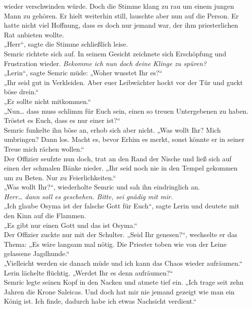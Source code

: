 wieder verschwinden würde. Doch die Stimme klang zu rau um einem jungen Mann zu gehören. Er hielt 
weiterhin still, lauschte aber nun auf die Person. Er hatte nicht viel Hoffnung, dass es doch nur 
jemand war, der ihm priesterlichen Rat anbieten wollte.\\
„Herr“, sagte die Stimme schließlich leise.\\
Semric richtete sich auf. In seinem Gesicht zeichnete sich Erschöpfung und Frustration wieder. 
\textit{Bekomme ich nun doch deine Klinge zu spüren?}\\
„Lerin“, sagte Semric müde: „Woher wusstet Ihr es?“\\
„Ihr seid gut in Verkleiden. Aber euer Leibwächter hockt vor der Tür und guckt böse drein.“\\
„Er sollte nicht mitkommen.“\\
„Nun… dass muss schlimm für Euch sein, einen so treuen Untergebenen zu haben. Tröstet es Euch, dass 
es nur einer ist?“\\
Semric funkelte ihn böse an, erhob sich aber nicht. „Was wollt Ihr? Mich umbringen? Dann los. Macht 
es, bevor Erhim es merkt, sonst könnte er in seiner Treue mich rächen wollen.“\\
Der Offizier seufzte nun doch, trat an den Rand der Nische und ließ sich auf einen der schmalen 
Bänke nieder. „Ihr seid noch nie in den Tempel gekommen um zu Beten. Nur zu Feierlichkeiten.“\\
„Was wollt Ihr?“, wiederholte Semric und sah ihn eindringlich an.\\
\textit{Herr… dann soll es geschehen. Bitte, sei gnädig mit mir.}\\
„Ich glaube Osyma ist der falsche Gott für Euch“, sagte Lerin und deutete mit den Kinn auf die 
Flammen.\\
„Es gibt nur einen Gott und das ist Osyma.“\\
Der Offizier zuckte nur mit der Schulter. „Seid Ihr genesen?“, wechselte er das Thema: „Es wäre 
langsam mal nötig. Die Priester toben wie von der Leine gelassene Jagdhunde.“\\
„Vielleicht werden sie danach müde und ich kann das Chaos wieder aufräumen.“\\
Lerin lächelte flüchtig. „Werdet Ihr es denn aufräumen?“\\
Semric legte seinen Kopf in den Nacken und atmete tief ein. „Ich trage seit zehn Jahren die Krone 
Saleicas. Und doch hat mir nie jemand gezeigt wie man ein König ist. Ich finde, dadurch habe ich 
etwas Nachsicht verdient.“\\
